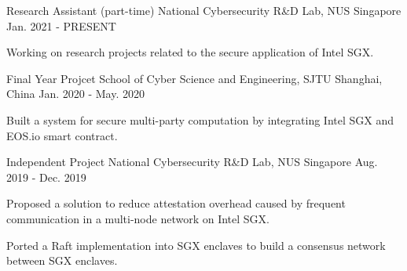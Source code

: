 

\begin{cventries}


    \cventry
    {Research Assistant (part-time)} %
    {National Cybersecurity R\&D Lab, NUS} %
    {Singapore} %
    {Jan. 2021 - PRESENT} %
    { %
        \begin{cvitems}
            \item Working on research projects related to the secure application of Intel SGX.
        \end{cvitems}
    }


    \cventry
    {Final Year Projcet} %
    {School of Cyber Science and Engineering, SJTU} %
    {Shanghai, China} %
    {Jan. 2020 - May. 2020} %
    { %
        \begin{cvitems}
            \item Built a system for secure multi-party computation by integrating Intel SGX and EOS.io smart contract.
        \end{cvitems}
    }


    \cventry
    {Independent Project} %
    {National Cybersecurity R\&D Lab, NUS} %
    {Singapore} %
    {Aug. 2019 - Dec. 2019} %
    { %
        \begin{cvitems}
            \item Proposed a solution to reduce attestation overhead caused by frequent communication in a multi-node network on Intel SGX.
            \item Ported a {Raft} implementation into SGX enclaves to build a consensus network between SGX enclaves.
        \end{cvitems}
    }



\end{cventries}
